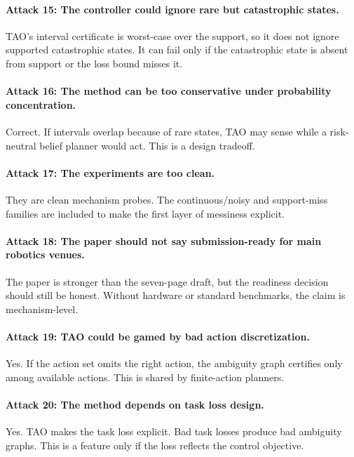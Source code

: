 \documentclass{article}
\begin{document}
\paragraph{Attack 15: The controller could ignore rare but catastrophic states.}
TAO's interval certificate is worst-case over the support, so it does not ignore supported catastrophic states. It can fail only if the catastrophic state is absent from support or the loss bound misses it.

\paragraph{Attack 16: The method can be too conservative under probability concentration.}
Correct. If intervals overlap because of rare states, TAO may sense while a risk-neutral belief planner would act. This is a design tradeoff.

\paragraph{Attack 17: The experiments are too clean.}
They are clean mechanism probes. The continuous/noisy and support-miss families are included to make the first layer of messiness explicit.

\paragraph{Attack 18: The paper should not say submission-ready for main robotics venues.}
The paper is stronger than the seven-page draft, but the readiness decision should still be honest. Without hardware or standard benchmarks, the claim is mechanism-level.

\paragraph{Attack 19: TAO could be gamed by bad action discretization.}
Yes. If the action set omits the right action, the ambiguity graph certifies only among available actions. This is shared by finite-action planners.

\paragraph{Attack 20: The method depends on task loss design.}
Yes. TAO makes the task loss explicit. Bad task losses produce bad ambiguity graphs. This is a feature only if the loss reflects the control objective.
\end{document}
